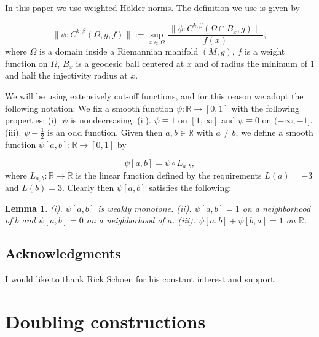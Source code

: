\documentclass[12pt,namelimits,sumlimits]{amsart}
\newtheorem{lemma}[theorem]{Lemma}
\theoremstyle{remark}
\numberwithin{equation}{section}
\begin{document}
In this paper we use weighted H\"{o}lder norms.
The definition we use is given by
\addtocounter{theorem}{1}
\begin{equation}
\label{E:weightedHolder}
\|\phi: C^{k,\beta}(\Omega,g,f)\|:=
\sup_{x\in\Omega}\frac{\,\|\phi:C^{k,\beta}(\Omega\cap B_x,g)\|\,}{f(x)},
\end{equation}
where $\Omega$ is a domain inside a Riemannian manifold $(M,g)$,
$f$ is a weight function on $\Omega$,
$B_x$ is a geodesic ball centered at $x$ and of radius the minimum of
$1$ and half the injectivity radius at $x$.

We will be using extensively cut-off functions,
and for this reason we adopt the following notation:
We fix a smooth function $\psi:{\mathbb{R}}\to[0,1]$ with the following properties:
\newline
(i).
$\psi$ is nondecreasing.
\newline
(ii).
$\psi\equiv1$ on $[1,\infty]$ and $\psi\equiv0$ on $(-\infty,-1]$.
\newline
(iii).
$\psi-\frac12$ is an odd function.
\newline
Given then $a,b\in {\mathbb{R}}$ with $a\ne b$,
we define a smooth function $\psi[a,b]:{\mathbb{R}}\to[0,1]$
by
\addtocounter{theorem}{1}
\begin{equation}
\label{Epsiab}
\psi[a,b]=\psi\circ L_{a,b},
\end{equation}
where $L_{a,b}:{\mathbb{R}}\to{\mathbb{R}}$ is the linear function defined by the requirements $L(a)=-3$ and $L(b)=3$.
Clearly then $\psi[a,b]$ satisfies the following:
\addtocounter{equation}{1}
\begin{lemma}
\label{Lpsiab}
(i).
$\psi[a,b]$ is weakly monotone.
\newline
(ii).
$\psi[a,b]=1$ on a neighborhood of $b$ and 
$\psi[a,b]=0$ on a neighborhood of $a$.
\newline
(iii).
$\psi[a,b]+\psi[b,a]=1$ on ${\mathbb{R}}$.
\end{lemma}

\subsection*{Acknowledgments}
I would like to thank Rick Schoen for his constant interest and support.

\section{Doubling constructions}
\label{Sdoubling}
\nopagebreak
\end{document}
